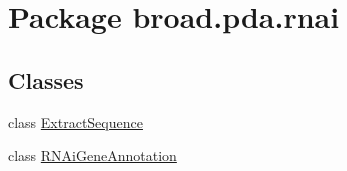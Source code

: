 \hypertarget{namespacebroad_1_1pda_1_1rnai}{\section{Package broad.\+pda.\+rnai}
\label{namespacebroad_1_1pda_1_1rnai}
}
\subsection*{Classes}
\begin{DoxyCompactItemize}
\item 
class \hyperlink{classbroad_1_1pda_1_1rnai_1_1_extract_sequence}{Extract\+Sequence}
\item 
class \hyperlink{classbroad_1_1pda_1_1rnai_1_1_r_n_ai_gene_annotation}{R\+N\+Ai\+Gene\+Annotation}
\end{DoxyCompactItemize}
